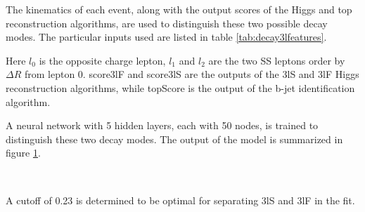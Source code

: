 The kinematics of each event, along with the output scores of the Higgs and top reconstruction algorithms, are used to distinguish these two possible decay modes. The particular inputs used are listed in table \ref{tab:decay3lfeatures}.



Here $l_0$ is the opposite charge lepton, $l_1$ and $l_2$ are the two SS leptons order by $\Delta R$ from lepton 0. score3lF and score3lS are the outputs of the 3lS and 3lF Higgs reconstruction algorithms, while topScore is the output of the b-jet identification algorithm.

A neural network with 5 hidden layers, each with 50 nodes, is trained to distinguish these two decay modes. The output of the model is summarized in figure \ref{fig:decayResults}.

\begin{figure}[h!]
    \\
    \caption{}
    \label{fig:decayResults}
\end{figure}

A cutoff of 0.23 is determined to be optimal for separating 3lS and 3lF in the fit.



